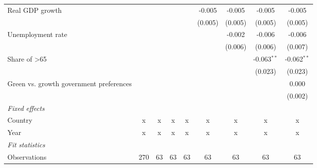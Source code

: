 \begin{table}[htbp]
\begin{tabular}{lcccccccc}
      Real GDP growth                                                         &         &         &                &                & -0.005         & -0.005         & -0.005         & -0.005\\   
                                                                              &         &         &                &                & (0.005)        & (0.005)        & (0.005)        & (0.005)\\   
      Unemployment rate                                                       &         &         &                &                &                & -0.002         & -0.006         & -0.006\\   
                                                                              &         &         &                &                &                & (0.006)        & (0.006)        & (0.007)\\   
      Share of >65                                                            &         &         &                &                &                &                & -0.063$^{**}$  & -0.062$^{**}$\\   
                                                                              &         &         &                &                &                &                & (0.023)        & (0.023)\\   
      Green vs. growth government preferences                                 &         &         &                &                &                &                &                & 0.000\\   
                                                                              &         &         &                &                &                &                &                & (0.002)\\   
      \emph{Fixed effects}\\
      Country                                                                 & x       & x       & x              & x              & x              & x              & x              & x\\  
      Year                                                                    & x       & x       & x              & x              & x              & x              & x              & x\\  
      \midrule \emph{Fit statistics}\\
      Observations                                                            & 270     & 63      & 63             & 63             & 63             & 63             & 63             & 63\\  

\end{tabular}
\end{table}
